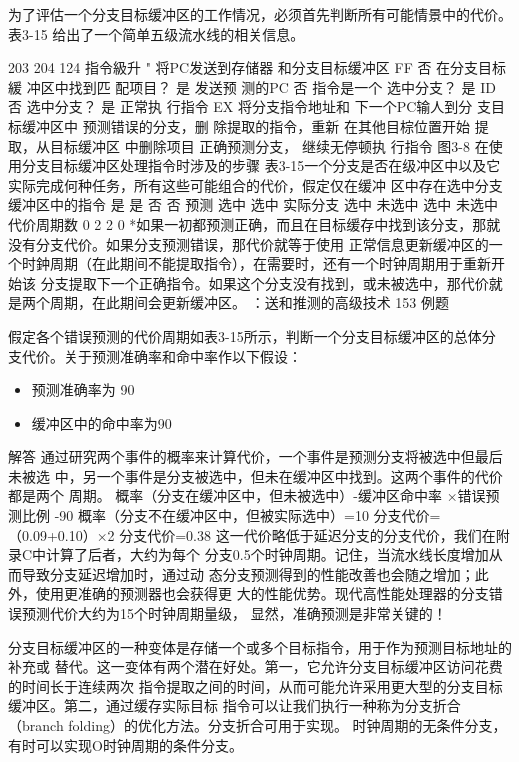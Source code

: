 为了评估一个分支目标缓冲区的工作情况，必须首先判断所有可能情景中的代价。表3-15
给出了一个简单五级流水线的相关信息。

203
204
124
指令級升 "
将PC发送到存储器
和分支目标缓冲区
FF
否
在分支目标緩
冲区中找到匹
配项目？
是
发送预
测的PC
否
指令是一个
选中分支？
是
ID
否
选中分支？
是
正常执
行指令
EX
将分支指令地址和
下一个PC输人到分
支目标缓冲区中
预测错误的分支，删
除提取的指令，重新
在其他目棕位置开始
提取，从目标缓冲区
中删除项目
正确预测分支，
继续无停顿执
行指令
图3-8 在使用分支目标缓冲区处理指令时涉及的步骤
表3-15一个分支是否在级冲区中以及它实际完成何种任务，所有这些可能组合的代价，假定仅在缓冲
区中存在选中分支
缓冲区中的指令
是
是
否
否
预测
选中
选中
实际分支
选中
未选中
选中
未选中
代价周期数
0
2
2
0
*如果一初都预测正确，而且在目标缓存中找到该分支，那就没有分支代价。如果分支预测错误，那代价就等于使用
正常信息更新缓冲区的一个时鈡周期（在此期间不能提取指令），在需要时，还有一个时钟周期用于重新开始该
分支提取下一个正确指令。如果这个分支没有找到，或未被选中，那代价就是两个周期，在此期间会更新缓冲区。
：送和推测的高级技术
153
例题

假定各个错误预测的代价周期如表3-15所示，判断一个分支目标缓冲区的总体分
支代价。关于预测准确率和命中率作以下假设：
\begin{itemize}
    \item 预测准确率为 90%
    \item 缓冲区中的命中率为90%
\end{itemize}
解答
通过研究两个事件的概率来计算代价，一个事件是预测分支将被选中但最后未被选
中，另一个事件是分支被选中，但未在缓冲区中找到。这两个事件的代价都是两个
周期。
概率（分支在缓冲区中，但未被选中）-缓冲区命中率 ×错误预测比例
-90%
概率（分支不在缓冲区中，但被实际选中）=10%
分支代价=（0.09+0.10）×2
分支代价=0.38
这一代价略低于延迟分支的分支代价，我们在附录C中计算了后者，大约为每个
分支0.5个时钟周期。记住，当流水线长度增加从而导致分支延迟增加时，通过动
态分支预测得到的性能改善也会随之增加；此外，使用更准确的预测器也会获得更
大的性能优势。现代高性能处理器的分支错误预测代价大约为15个时钟周期量级，
显然，准确预测是非常关键的！

分支目标缓冲区的一种变体是存储一个或多个目标指令，用于作为预测目标地址的补充或
替代。这一变体有两个潜在好处。第一，它允许分支目标缓冲区访问花费的时间长于连续两次
指令提取之间的时间，从而可能允许采用更大型的分支目标缓冲区。第二，通过缓存实际目标
指令可以让我们执行一种称为分支折合（branch folding）的优化方法。分支折合可用于实现。
时钟周期的无条件分支，有时可以实现O时钟周期的条件分支。

